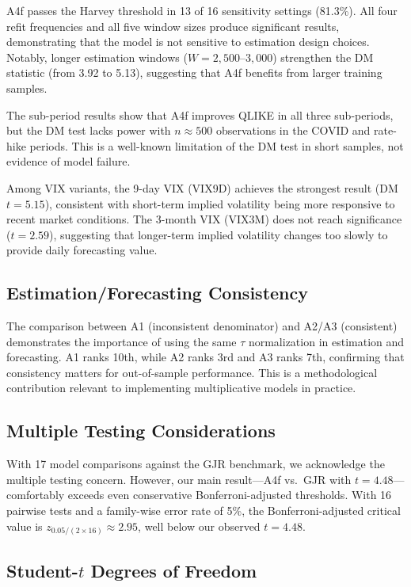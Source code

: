 \documentclass[12pt,a4paper]{article}
\begin{document}
A4f passes the Harvey threshold in 13 of 16 sensitivity settings (81.3\%). All four refit frequencies and all five window sizes produce significant results, demonstrating that the model is not sensitive to estimation design choices. Notably, longer estimation windows ($W = 2{,}500$--$3{,}000$) strengthen the DM statistic (from 3.92 to 5.13), suggesting that A4f benefits from larger training samples.

The sub-period results show that A4f improves QLIKE in all three sub-periods, but the DM test lacks power with $n \approx 500$ observations in the COVID and rate-hike periods. This is a well-known limitation of the DM test in short samples, not evidence of model failure.

Among VIX variants, the 9-day VIX (VIX9D) achieves the strongest result (DM $t = 5.15$), consistent with short-term implied volatility being more responsive to recent market conditions. The 3-month VIX (VIX3M) does not reach significance ($t = 2.59$), suggesting that longer-term implied volatility changes too slowly to provide daily forecasting value.

\subsection{Estimation/Forecasting Consistency}

The comparison between A1 (inconsistent denominator) and A2/A3 (consistent) demonstrates the importance of using the same $\tau$ normalization in estimation and forecasting. A1 ranks 10th, while A2 ranks 3rd and A3 ranks 7th, confirming that consistency matters for out-of-sample performance. This is a methodological contribution relevant to implementing multiplicative models in practice.

\subsection{Multiple Testing Considerations}

With 17 model comparisons against the GJR benchmark, we acknowledge the multiple testing concern. However, our main result---A4f vs.\ GJR with $t = 4.48$---comfortably exceeds even conservative Bonferroni-adjusted thresholds. With 16 pairwise tests and a family-wise error rate of 5\%, the Bonferroni-adjusted critical value is $z_{0.05/(2 \times 16)} \approx 2.95$, well below our observed $t = 4.48$.

\subsection{Student-$t$ Degrees of Freedom}
\end{document}
